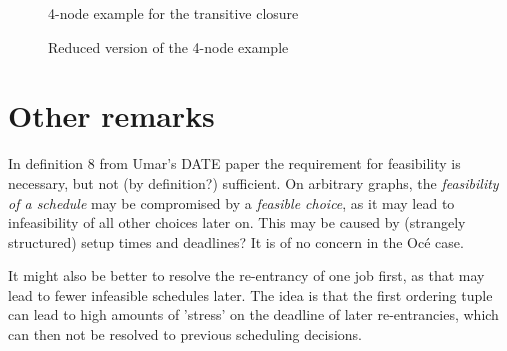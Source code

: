 \documentclass[]{article}
\begin{document}
\begin{figure}
    \centering
    \caption{4-node example for the transitive closure}
    \label{fig:transitive_closure_4_node_example}
    
    \caption{Reduced version of the 4-node example}
    \label{fig:transitive_closure_4_node_example_reduced}
    
\end{figure}

\section{Other remarks}
In definition 8 from Umar's DATE paper the requirement for feasibility is necessary, but not (by definition?) sufficient. On arbitrary graphs, the \textit{feasibility of a schedule} may be compromised by a \textit{feasible choice}, as it may lead to infeasibility of all other choices later on. This may be caused by (strangely structured) setup times and deadlines? It is of no concern in the Oc\'e case.

It might also be better to resolve the re-entrancy of one job first, as that may lead to fewer infeasible schedules later. The idea is that the first ordering tuple can lead to high amounts of 'stress' on the deadline of later re-entrancies, which can then not be resolved to previous scheduling decisions.



\end{document}
